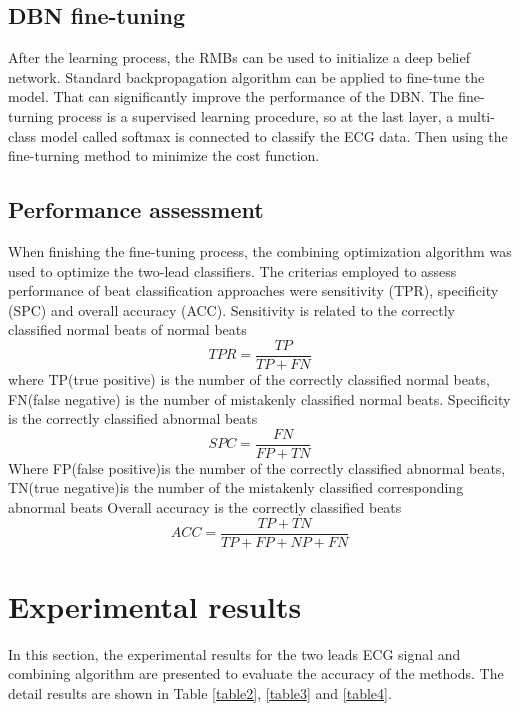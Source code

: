 \documentclass[conference]{IEEEtran}
\begin{document}
\subsection{DBN fine-tuning}

After the learning process, the RMBs can be used to initialize a deep belief network. Standard backpropagation algorithm can be applied to fine-tune the model. That can significantly improve the performance of the DBN. The fine-turning process is a supervised learning procedure, so at the last layer, a multi-class model called softmax is connected to classify the ECG data. Then using the fine-turning method to minimize the cost function.

\subsection{Performance assessment}

When finishing the fine-tuning process, the combining optimization algorithm was used to optimize the two-lead classifiers. The criterias employed to assess performance of beat classification approaches were sensitivity (TPR), specificity (SPC) and overall accuracy (ACC). Sensitivity is related to the correctly classified normal beats of normal beats
\begin{equation}
TPR = \frac{TP}{TP+FN}
\end{equation}
where TP(true positive) is the number of the correctly classified normal beats, FN(false negative) is the number of mistakenly classified normal beats. Specificity is the correctly classified abnormal beats
\begin{equation}
SPC = \frac{FN}{FP+TN}
\end{equation}
Where FP(false positive)is the number of the correctly classified abnormal beats, TN(true negative)is the number of the mistakenly classified corresponding abnormal beats Overall accuracy is the correctly classified beats
\begin{equation}
ACC = \frac{TP+TN}{TP+FP+NP+FN}
\end{equation}

\section{Experimental results}

In this section, the experimental results for the two leads ECG signal and combining algorithm are presented to evaluate the accuracy of the methods. The detail results are shown in Table \ref{table2}, \ref{table3} and \ref{table4}.
\end{document}
